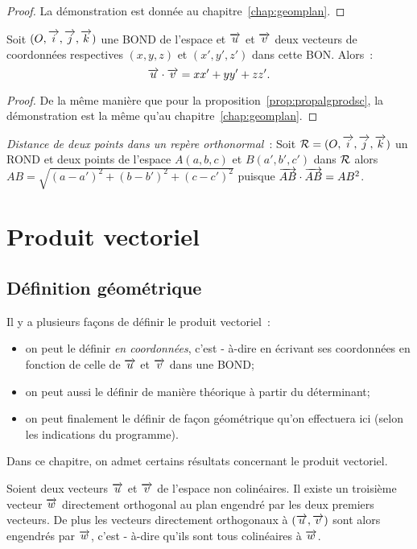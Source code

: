 \begin{proof}
  La démonstration est donnée au chapitre~\ref{chap:geomplan}.
\end{proof}

\begin{prop}
  Soit \((O,\overrightarrow{i},\overrightarrow{j},\overrightarrow{k})\) une BOND de l'espace et \(\overrightarrow{u}\) et \(\overrightarrow{v}\) deux vecteurs
  de coordonnées respectives \((x, y, z)\) et \((x', y', z')\) dans cette
  BON\@.  Alors~:
  \begin{equation}
    \overrightarrow{u}\cdot\overrightarrow{v} = xx' + yy' + zz'.
  \end{equation}
\end{prop}

\begin{proof}
  De la même manière que pour la proposition~\ref{prop:propalgprodsc}, la
  démonstration est la même qu'au chapitre~\ref{chap:geomplan}.
\end{proof}

\emph{Distance de deux points dans un repère orthonormal}~: Soit \(\mathcal{R} =
(O,\overrightarrow{i},\overrightarrow{j},\overrightarrow{k})\) un ROND et deux points de l'espace \(A(a, b, c)\) et \(B(a', b',
c')\) dans \(\mathcal{R}\) alors \(AB = \sqrt{(a - a')^2 + (b - b')^2 + (c - c')^2}\)
puisque \(\overrightarrow{AB}\cdot\overrightarrow{AB} = AB^2\).

\section{Produit vectoriel}
\label{sec:prodvec}

\subsection{Définition géométrique}
Il y a plusieurs façons de définir le produit vectoriel~:
\begin{itemize}
  \item on peut le définir \emph{en coordonnées}, c'est - à-dire en écrivant
    ses coordonnées en fonction de celle de \(\overrightarrow{u}\) et \(\overrightarrow{v}\) dans une BOND;
  \item on peut aussi le définir de manière théorique à partir du déterminant;
  \item on peut finalement le définir de façon géométrique qu'on effectuera
    ici (selon les indications du programme).
\end{itemize}

Dans ce chapitre, on admet certains résultats concernant le produit vectoriel.
\begin{prop}[admise]
  Soient deux vecteurs \(\overrightarrow{u}\) et \(\overrightarrow{v}\) de l'espace non colinéaires. Il
  existe un troisième vecteur \(\overrightarrow{w}\) directement orthogonal au plan engendré
  par les deux premiers vecteurs. De plus les vecteurs directement orthogonaux
  à \((\overrightarrow{u}, \overrightarrow{v})\) sont alors engendrés par \(\overrightarrow{w}\), c'est - à-dire qu'ils
  sont tous colinéaires à \(\overrightarrow{w}\).
\end{prop}

